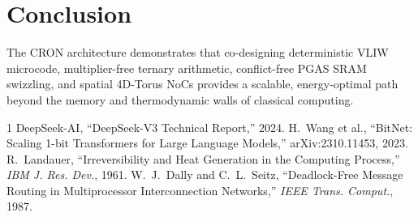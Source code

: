 \documentclass[10pt,journal,compsoc]{IEEEtran}
\begin{document}
\section{Conclusion}
The CRON architecture demonstrates that co-designing deterministic VLIW microcode, multiplier-free ternary arithmetic, conflict-free PGAS SRAM swizzling, and spatial 4D-Torus NoCs provides a scalable, energy-optimal path beyond the memory and thermodynamic walls of classical computing.

\begin{thebibliography}{1}
 DeepSeek-AI, ``DeepSeek-V3 Technical Report,'' 2024.
 H.~Wang et al., ``BitNet: Scaling 1-bit Transformers for Large Language Models,'' arXiv:2310.11453, 2023.
 R.~Landauer, ``Irreversibility and Heat Generation in the Computing Process,'' \emph{IBM J. Res. Dev.}, 1961.
 W.~J.~Dally and C.~L.~Seitz, ``Deadlock-Free Message Routing in Multiprocessor Interconnection Networks,'' \emph{IEEE Trans. Comput.}, 1987.
\end{thebibliography}
\end{document}
